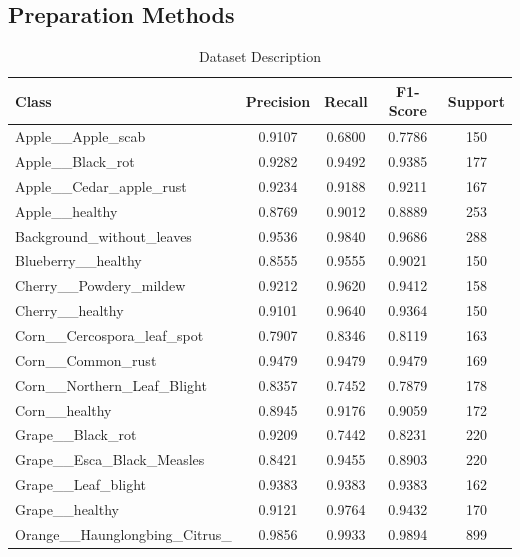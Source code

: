 \documentclass[conference]{IEEEtran}
\renewcommand{\arraystretch}{1.5}
\begin{document}
\subsection{\textbf{Preparation Methods}}

\begin{table}[ht]
\caption{Dataset Description}
    \centering
    \renewcommand{\arraystretch}{1.2} %
    \setlength{\tabcolsep}{1pt} %
    \begin{adjustbox}{max width=\textwidth}
    \begin{tabular}{|p{4.5cm}|c|c|c|c|}
        \hline
        \textbf{Class} & \textbf{Precision} & \textbf{Recall} & \textbf{F1-Score} & \textbf{Support} \\
        \hline
        Apple\_\_Apple\_scab & 0.9107 & 0.6800 & 0.7786 & 150 \\
        \hline
        Apple\_\_Black\_rot & 0.9282 & 0.9492 & 0.9385 & 177 \\
        \hline
        Apple\_\_Cedar\_apple\_rust & 0.9234 & 0.9188 & 0.9211 & 167 \\
        \hline
        Apple\_\_healthy & 0.8769 & 0.9012 & 0.8889 & 253 \\
        \hline
        Background\_without\_leaves & 0.9536 & 0.9840 & 0.9686 & 288 \\
        \hline
        Blueberry\_\_healthy & 0.8555 & 0.9555 & 0.9021 & 150 \\
        \hline
        Cherry\_\_Powdery\_mildew & 0.9212 & 0.9620 & 0.9412 & 158 \\
        \hline
        Cherry\_\_healthy & 0.9101 & 0.9640 & 0.9364 & 150 \\
        \hline
        Corn\_\_Cercospora\_leaf\_spot & 0.7907 & 0.8346 & 0.8119 & 163 \\
        \hline
        Corn\_\_Common\_rust & 0.9479 & 0.9479 & 0.9479 & 169 \\
        \hline
        Corn\_\_Northern\_Leaf\_Blight & 0.8357 & 0.7452 & 0.7879 & 178 \\
        \hline
        Corn\_\_healthy & 0.8945 & 0.9176 & 0.9059 & 172 \\
        \hline
        Grape\_\_Black\_rot & 0.9209 & 0.7442 & 0.8231 & 220 \\
        \hline
        Grape\_\_Esca\_Black\_Measles & 0.8421 & 0.9455 & 0.8903 & 220 \\
        \hline
        Grape\_\_Leaf\_blight & 0.9383 & 0.9383 & 0.9383 & 162 \\
        \hline
        Grape\_\_healthy & 0.9121 & 0.9764 & 0.9432 & 170 \\
        \hline
        Orange\_\_Haunglongbing\_Citrus\_ & 0.9856 & 0.9933 & 0.9894 & 899 \\
        

\end{tabular}
\end{adjustbox}
\end{table}
\end{document}
